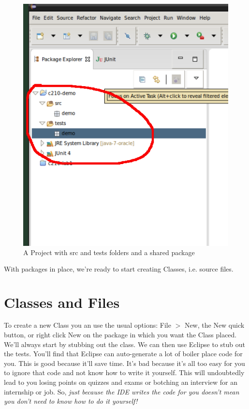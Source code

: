 \documentclass[]{tufte-handout}
\begin{document}
\vspace{.1in}
\begin{center}
\begin{figure}[h]
\includegraphics[scale=.5]{Eclipse-ProjectWithPacks.png}
\caption{A Project with src and tests folders and a shared package}
\label{fig:projWithPacks} 
\end{figure}
\end{center}
\vspace{.1in}

With packages in place, we're ready to start creating Classes, i.e. source files.

\section{Classes and Files}

To create a new Class you an use the usual options: File $>$ New, the New quick button, or right click New on the package in which you want the Class placed. We'll always start by stubbing out the class. We can then use Eclipse to stub out the tests. You'll find that Eclipse can auto-generate a lot of boiler place code for you. This is good because it'll save time. It's bad because it's all too easy for you to ignore that code and not know how to write it yourself. This will undoubtedly lead to you losing points on quizzes and exams or botching an interview for an internship or job. So, \textit{just because the IDE writes the code for you doesn't mean you don't need to know how to do it yourself!}
\end{document}
